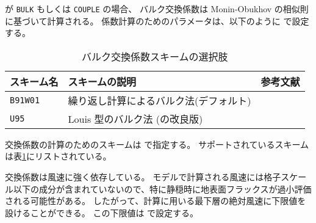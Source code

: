  が \verb|BULK| もしくは \verb|COUPLE| の場合、
バルク交換係数は Monin-Obukhov の相似則に基づいて計算される。
係数計算のためのパラメータは、以下のように  で設定する。
%

\begin{table}[h]
\begin{center}
  \caption{バルク交換係数スキームの選択肢}
  \label{tab:nml_bulk}
  \begin{tabularx}{150mm}{llX} \hline
    \rowcolor[gray]{0.9}  スキーム名 & スキームの説明 & 参考文献 \\ \hline
      \verb|B91W01| & 繰り返し計算によるバルク法(デフォルト) & \citet{beljaars_1991,wilson_2001} \\
      \verb|U95|    & Louis 型のバルク法 (\citet{louis_1979}の改良版) & \citet{uno_1995} \\
    \hline
  \end{tabularx}
\end{center}
\end{table}

交換係数の計算のためのスキームは  で指定する。
サポートされているスキームは表\ref{tab:nml_bulk}にリストされている。

交換係数は風速に強く依存している。
モデルで計算される風速には格子スケール以下の成分が含まれていないので、特に静穏時に地表面フラックスが過小評価される可能性がある。
したがって、計算に用いる最下層の絶対風速に下限値を設けることができる。
この下限値は  で設定する。

